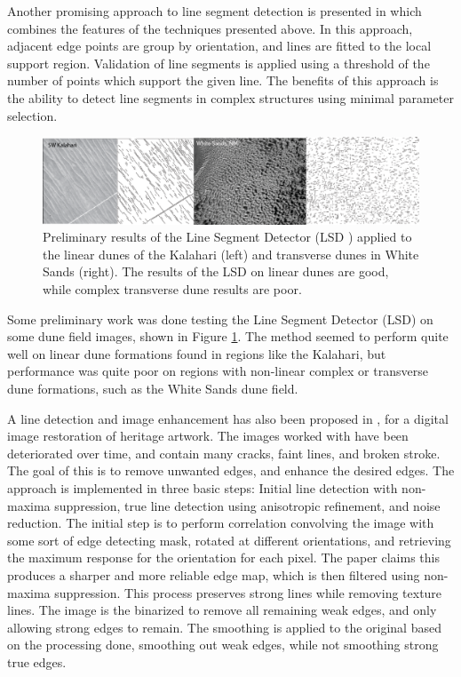Another promising approach to line segment detection is presented in \cite{2010_lsd_fast_line_segment_detector} which combines the features of the techniques presented above. In this approach, adjacent edge points are group by orientation, and lines are fitted to the local support region. Validation of line segments is applied using a threshold of the number of points which support the given line. The benefits of this approach is the ability to detect line segments in complex structures using minimal parameter selection. 

\begin{figure}
	\centering
	\includegraphics[width=\linewidth]{figures/lsd_results}
	\caption{Preliminary results of the Line Segment Detector (LSD \cite{2010_lsd_fast_line_segment_detector}) applied to the linear dunes of the Kalahari (left) and transverse dunes in White Sands (right). The results of the LSD on linear dunes are good, while complex transverse dune results are poor.}
	\label{fig:lsd_results}
\end{figure}

Some preliminary work was done testing the Line Segment Detector (LSD) on some dune field images, shown in Figure \ref{fig:lsd_results}. The method seemed to perform quite well on linear dune formations found in regions like the Kalahari, but performance was quite poor on regions with non-linear complex or transverse dune formations, such as the White Sands dune field.

A line detection and image enhancement has also been proposed in \cite{Robust_Faint_Line_Detection_Enhancement_Algorithm}, for a digital image restoration of heritage artwork. The images worked with have been deteriorated over time, and contain many cracks, faint lines, and broken stroke. The goal of this is to remove unwanted edges, and enhance the desired edges. The approach is implemented in three basic steps: Initial line detection with non-maxima suppression, true line detection using anisotropic refinement, and noise reduction. The initial step is to perform correlation convolving the image with some sort of edge detecting mask, rotated at different orientations, and retrieving the maximum response for the orientation	for each pixel. The paper claims this produces a sharper and more reliable edge map, which is then filtered using non-maxima suppression. This process preserves strong lines while removing texture lines. The image is the binarized to remove all remaining weak edges, and only allowing strong edges to remain. The smoothing is applied to the original based on the processing done, smoothing out weak edges, while not smoothing strong true edges.

